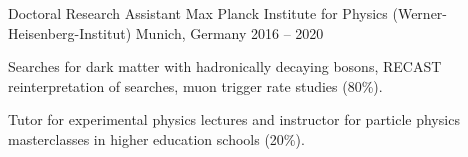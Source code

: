 \begin{cventries}
    \cventry
      {Doctoral Research Assistant} %
      {Max Planck Institute for Physics (Werner-Heisenberg-Institut)} %
      {Munich, Germany} %
      {2016 -- 2020} %
      {
        \begin{cvitems} %
          \item {Searches for dark matter with hadronically decaying bosons, RECAST reinterpretation of searches, muon trigger rate studies (80\%).}
          \item {Tutor for experimental physics lectures and instructor for particle physics masterclasses in higher education schools (20\%).}
        \end{cvitems}
      }
  
  \end{cventries}
  